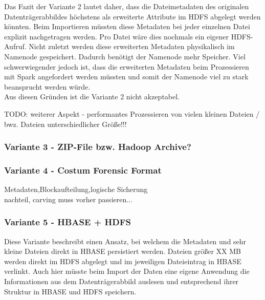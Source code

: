 \noindent
Das Fazit der Variante 2 lautet daher, dass die Dateimetadaten des originalen Datenträgerabbildes höchstens als erweiterte Attribute im HDFS abgelegt werden könnten. Beim Importieren müssten diese Metadaten bei jeder einzelnen Datei explizit nachgetragen werden. Pro Datei wäre dies nochmals ein eigener HDFS-Aufruf. Nicht zuletzt werden diese erweiterten Metadaten physikalisch im Namenode gespeichert. Dadurch benötigt der Namenode mehr Speicher. Viel schwerwiegender jedoch ist, dass die erweiterten Metadaten beim Prozessieren mit Spark angefordert werden müssten und somit der Namenode viel zu stark beansprucht werden würde.\\
Aus diesen Gründen ist die Variante 2 nicht akzeptabel. 

\noindent
TODO: weiterer Aspekt - performantes Prozessieren von vielen kleinen Dateien / bwz. Dateien unterschiedlicher Größe!!!\\

\subsubsection{Variante 3 - ZIP-File bzw. Hadoop Archive?}


\subsubsection{Variante 4 - Costum Forensic Format}
Metadaten,Blockaufteilung,logische Sicherung\\
nachteil, carving muss vorher passieren...

\subsubsection{Variante 5 - HBASE + HDFS}
Diese Variante beschreibt einen Ansatz, bei welchem die Metadaten und sehr kleine Dateien direkt in HBASE persistiert werden. Dateien größer XX MB werden direkt im HDFS abgelegt und im jeweiligen Dateieintrag in HBASE verlinkt. Auch hier müsste beim Import der Daten eine eigene Anwendung die Informationen aus dem Datenträgerabbild auslesen und entsprechend ihrer Struktur in HBASE und HDFS speichern.